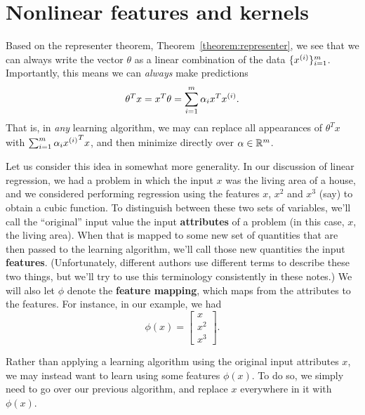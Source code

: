 \documentclass{article}
\begin{document}
\section{Nonlinear features and kernels}

Based on the representer theorem, Theorem~\ref{theorem:representer},
we see that we can always write the vector $\theta$ as
a linear combination of the data $\{{x^{(i)}}\}_{i=1}^m$. Importantly,
this means we can \emph{always} make predictions
\begin{equation*}
  \theta^T x = x^T \theta = \sum_{i = 1}^m \alpha_i x^T {x^{(i)}}.
\end{equation*}
That is, in \emph{any} learning algorithm, we may can replace all
appearances of $\theta^T x$ with $\sum_{i = 1}^m \alpha_i {x^{(i)}}^T x$,
and then minimize directly over $\alpha \in \mathbb{R}^m$.

Let us consider this idea in somewhat more generality. In our discussion of
linear regression, we had a problem in which the input $x$ was the living
area of a house, and we considered performing regression using the features
$x$, $x^2$ and $x^3$ (say) to obtain a cubic function.  To distinguish
between these two sets of variables, we'll call the ``original'' input value
the input {\bf attributes} of a problem (in this case, $x$, the living
area).  When that is mapped to some new set of quantities that are then
passed to the learning algorithm, we'll call those new quantities the input
{\bf features}.  (Unfortunately, different authors use different terms to
describe these two things, but we'll try to use this terminology
consistently in these notes.)  We will also let $\phi$ denote the {\bf
  feature mapping}, which maps from the attributes to the features.  For
instance, in our example, we had
\begin{equation*}
  \phi(x) = \left[\begin{matrix} x \\ x^2 \\ x^3 \end{matrix}\right].
\end{equation*}

Rather than applying a learning algorithm using the original input
attributes $x$, we may instead want to learn using some features $\phi(x)$.
To do so, we simply need to go over our previous algorithm, and replace $x$
everywhere in it with $\phi(x)$.
\end{document}
